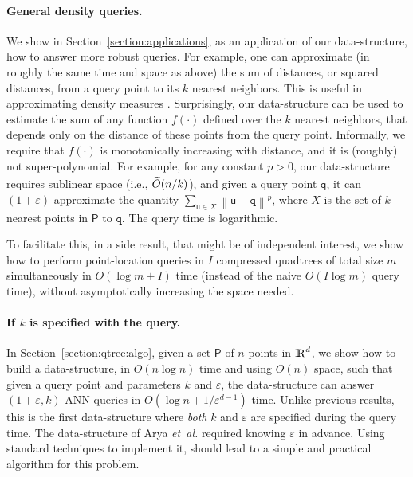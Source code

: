 \documentclass[12pt]{article}
\makeatletter
\newcommand{\Term}[1]{\textsf{#1}}
\newcommand{\TermI}[1]{\Term{#1}\index{#1@\Term{#1}}}
\theoremstyle{remark}{\theorembodyfont{\rm} \newtheorem{remark}[theorem]{Remark}}
\newcommand{\secref}[1]{Section~\ref{section:#1}}
\newcommand{\MakeBig}{\rule[-.2cm]{0cm}{0.4cm}}
\newcommand{\pth}[2][\!]{#1\left({#2}\right)}
\newcommand{\norm}[1]{\left\lVert {#1} \right \rVert}
\newcommand{\eps}{{\varepsilon}}\newcommand{\divides}{|}
\newcommand{\ANN}{\TermI{ANN}\xspace}
\newcommand{\etal}{\textit{et~al.}\xspace}
\renewcommand{\Re}{{\rm I\!\hspace{-0.025em} R}}
\newcommand{\PntSet}{\mathsf{P}}
\newcommand{\query}{\mathtt{q}}
\newcommand{\pntA}{\mathsf{u}}
\newcommand{\dist}[2]{\norm{{#1}- {#2}}}
\newcommand{\Otilde}{\widetilde{O}}
\makeatother
\begin{document}
\paragraph{General density queries.}
We show in \secref{applications}, as an application of our
data-structure, how to answer more robust queries.  For
example, one can approximate (in roughly the same time and space as
above) the sum of distances, or squared distances, from a query point
to its $k$ nearest neighbors. This is useful in approximating density
measures \cite{dhs-pc-01}. Surprisingly, our data-structure can be
used to estimate the sum of any function $f(\cdot)$ defined over the
$k$ nearest neighbors, that depends only on the distance of these
points from the query point. Informally, we require that $f(\cdot)$ is
monotonically increasing with distance, and it is (roughly) not
super-polynomial. For example, for any constant $p > 0$, our
data-structure requires sublinear space (i.e., $\Otilde \pth{
   n/k}^{\MakeBig}$), and given a query point $\query$, it can
$(1+\eps)$-approximate the quantity $\sum_{\pntA \in X}
\dist{\pntA}{\query}^p$, where $X$ is the set of $k$ nearest points 
in $\PntSet$ to $\query$. The query time is logarithmic.

To facilitate this, in a side result, that might be of independent
interest, we show how to perform point-location queries in $I$
compressed quadtrees of total size $m$ simultaneously in $O( \log m +
I)$ time (instead of the naive $O( I \log m)$ query time), without
asymptotically increasing the space needed.

\paragraph{If $k$ is specified with the query.}
In \secref{qtree:algo}, given a set $\PntSet$ of $n$ points in
$\Re^d$, we show how to build a data-structure, in $O(n \log n)$ time
and using $O(n)$ space, such that given a query point and parameters
$k$ and $\eps$, the data-structure can answer $(1+\eps,k)$-\ANN 
queries in $O( \log n + 1/\eps^{d-1})$
time. Unlike previous results, this is the first data-structure where
\emph{both} $k$ and $\eps$ are specified during the query
time. The data-structure of Arya \etal \cite{amm-sttas-05}
required knowing $\eps$ in advance. Using standard techniques
\cite{amnsw-oaann-98} to implement it, should lead to a simple and
practical algorithm for this problem.
\end{document}
